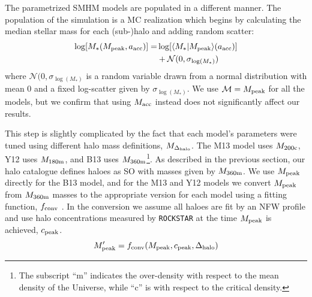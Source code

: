 \documentclass[useAMS,fleqn,usenatbib]{mnras}
\begin{document}
The parametrized SMHM models are populated in a different manner.  The population of the simulation is a MC realization which begins by calculating the median stellar mass for each (sub-)halo and adding random scatter:
%
\begin{align}
\label{eq:mstar_assign}
\log[M_*(M_{\rm peak}, a_{\rm acc})] =& \log[\langle M_* | M_{\rm peak}\rangle(a_{\rm acc})] \\ \nonumber
&+ \mathcal{N}(0,\sigma_{\log(M_*)})
\end{align}
%
where $\mathcal{N}(0,\sigma_{\log(M_*)}$ is a random variable drawn from a normal distribution with mean 0 and a fixed log-scatter given by $\sigma_{\log(M_*)}$.  We use $\mathcal{M} = M_{\rm peak}$ for all the models, but we confirm that using $M_{\rm acc}$ instead does not significantly affect our results.

This step is slightly complicated by the fact that each model's parameters were tuned using different halo mass definitions, $M_{\Delta_{\rm halo}}$. The M13 model uses $M_{200\rm c}$,  Y12 uses $M_{180\rm m}$, and B13 uses $M_{360\rm m}$\footnote{The subscript ``m'' indicates the over-density with respect to the mean density of the Universe, while ``c'' is with respect to the critical density.}.  As described in the previous section, our halo catalogue defines haloes as SO with masses given by $M_{360\rm m}$.  We use $M_{\rm peak}$ directly for the B13 model, and for the M13 and Y12 models we convert $M_{\rm peak}$ from $M_{360\rm m}$ masses to the appropriate version for each model using a fitting function, $f_{\rm conv}$ \citep[see appendix C in][]{Hu:2003dr}.  In the conversion we assume all haloes are fit by an NFW profile \citep{Navarro:1997if} and use halo concentrations measured by {\tt ROCKSTAR} at the time $M_{\rm peak}$ is achieved, $c_{\rm peak}$.
%
\begin{equation}
M_{\rm peak}^{\prime} = f_{\rm conv}(M_{\rm peak}, c_{\rm peak}, \Delta_{\rm halo})
\end{equation}
%
\end{document}
